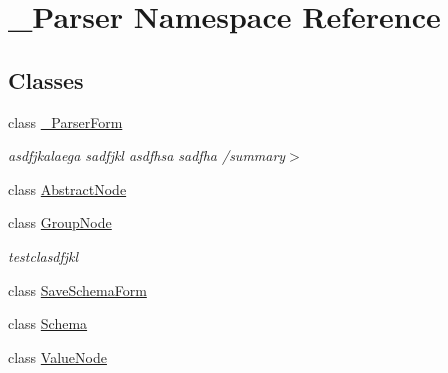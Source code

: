 \hypertarget{namespace__1920_parser}{}\section{\+\_\+Parser Namespace Reference}
\label{namespace__1920_parser}
\subsection*{Classes}
\begin{DoxyCompactItemize}
\item 
class \hyperlink{class__1920_parser_1_1__1920_parser_form}{\+\_\+Parser\+Form}
\begin{DoxyCompactList}\small\item\em asdfjkalaega sadfjkl asdfhsa sadfha /summary$>$ \end{DoxyCompactList}\item 
class \hyperlink{class__1920_parser_1_1_abstract_node}{Abstract\+Node}
\item 
class \hyperlink{class__1920_parser_1_1_group_node}{Group\+Node}
\begin{DoxyCompactList}\small\item\em testclasdfjkl \end{DoxyCompactList}\item 
class \hyperlink{class__1920_parser_1_1_save_schema_form}{Save\+Schema\+Form}
\item 
class \hyperlink{class__1920_parser_1_1_schema}{Schema}
\item 
class \hyperlink{class__1920_parser_1_1_value_node}{Value\+Node}
\end{DoxyCompactItemize}
